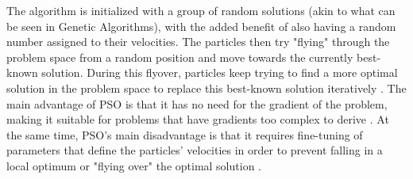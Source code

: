 \documentclass{article}
\begin{document}
The algorithm is initialized with a group of random solutions (akin to what can be seen in Genetic Algorithms), with the added benefit of also having a random number assigned to their velocities. The particles then try "flying" through the problem space from a random position and move towards the currently best-known solution. During this flyover, particles keep trying to find a more optimal solution in the problem space to replace this best-known solution iteratively \cite{Eberhart.Shi.2001}. The main advantage of PSO is that it has no need for the gradient of the problem, making it suitable for problems that have gradients too complex to derive \cite{Eberhart.Shi.2001}. At the same time, PSO's main disadvantage is that it requires fine-tuning of parameters that define the particles' velocities in order to prevent falling in a local optimum or "flying over" the optimal solution \cite{Eberhart.Shi.2001}.




\end{document}
